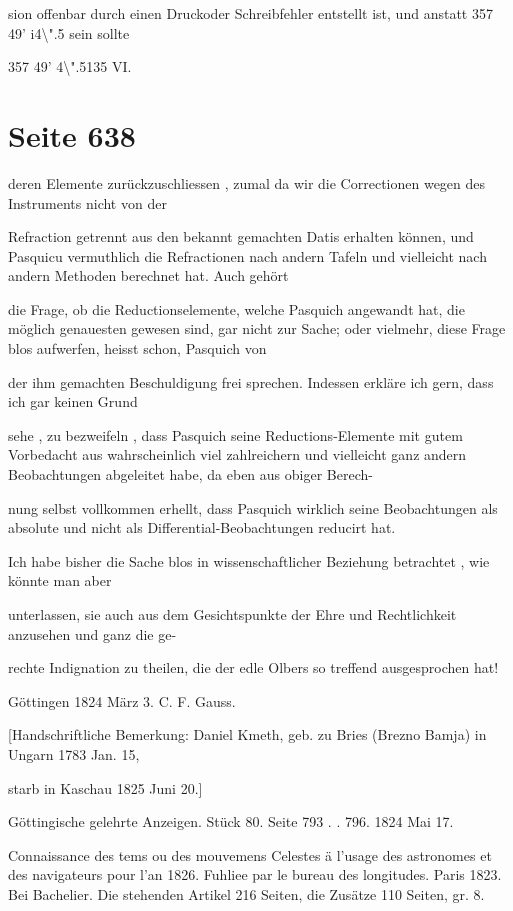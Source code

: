 \documentclass[10pt,a4paper]{article}
\begin{document}
sion offenbar durch einen Druckoder Schreibfehler entstellt ist, und anstatt 357\textdegree{} 49' i4\textbackslash{}".5 sein sollte

357\textdegree{} 49' 4\textbackslash{}".5135 VI.


\newpage
\section*{Seite 638}
deren Elemente zurückzuschliessen , zumal da wir die Correctionen wegen des Instruments nicht von der

Refraction getrennt aus den bekannt gemachten Datis erhalten können, und Pasquicu vermuthlich die Refractionen nach andern Tafeln und vielleicht nach andern Methoden berechnet hat. Auch gehört

die Frage, ob die Reductionselemente, welche Pasquich angewandt hat, die möglich genauesten gewesen sind, gar nicht zur Sache; oder vielmehr, diese Frage blos aufwerfen, heisst schon, Pasquich von

der ihm gemachten Beschuldigung frei sprechen. Indessen erkläre ich gern, dass ich gar keinen Grund

sehe , zu bezweifeln , dass Pasquich seine Reductions-Elemente mit gutem Vorbedacht aus wahrscheinlich viel zahlreichern und vielleicht ganz andern Beobachtungen abgeleitet habe, da eben aus obiger Berech-

nung selbst vollkommen erhellt, dass Pasquich wirklich seine Beobachtungen als absolute und nicht als Differential-Beobachtungen reducirt hat.

Ich habe bisher die Sache blos in wissenschaftlicher Beziehung betrachtet , wie könnte man aber

unterlassen, sie auch aus dem Gesichtspunkte der Ehre und Rechtlichkeit anzusehen und ganz die ge-

rechte Indignation zu theilen, die der edle Olbers so treffend ausgesprochen hat!

Göttingen 1824 März 3. C. F. Gauss.

[Handschriftliche Bemerkung: Daniel Kmeth, geb. zu Bries (Brezno Bamja) in Ungarn 1783 Jan. 15,

starb in Kaschau 1825 Juni 20.]

Göttingische gelehrte Anzeigen. Stück 80. Seite 793 . . 796. 1824 Mai 17.

Connaissance des tems ou des mouvemens Celestes ä l'usage des astronomes et des navigateurs pour l'an 1826. Fuhliee par le bureau des longitudes. Paris 1823. Bei Bachelier. Die stehenden Artikel 216 Seiten, die Zusätze 110 Seiten, gr. 8.
\end{document}
